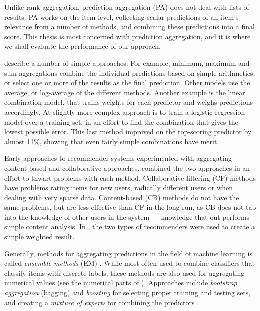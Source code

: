Unlike rank aggregation, prediction aggregation (PA) does not deal with lists of results.
PA works on the item-level, collecting scalar predictions of an item's relevance from a number of methods,
and combining these predictions into a final score.
This thesis is most concerned with prediction aggregation,
and it is where we shall evaluate the performance of our approach.

\cite{Aslam2001} describe a number of simple approaches.
For example, minimum, maximum and sum aggregations combine the individual 
predictions based on simple arithmetics, 
or select one or more of the results as the final prediction. 
Other models use the average, or log-average of the different methods.
Another example is the linear combination model, that trains weights for each predictor and weighs predictions accordingly.
At slightly more complex approach is to train a logistic regression model \cite[p.3]{Aslam2001}
over a training set, in an effort to find the combination that gives the lowest possible error.
This last method improved on the top-scoring predictor by almost 11\%,
showing that even fairly simple combinations have merit.

Early approaches to recommender systems experimented with aggregating content-based and collaborative approaches.
\cite{Claypool1999} combined the two approaches in an effort to thwart problems with each method.
Collaborative filtering (CF) methods have problems rating items for new users, radically different users or when dealing with very sparse data.
Content-based (CB) methods do not have the same problems, but are less effective than CF in the long run, as CB does not tap into the 
knowledge of other users in the system --- knowledge that out-performs simple content analysis.
In \cite{Claypool1999}, the two types of recommenders were used to create a simple weighted result.

Generally, methods for aggregating predictions in the field of machine learning is called \emph{ensemble methods} (EM) \cite{Dietterich2000}.
While most often used to combine classifiers that classify items with discrete labels,
these methods are also used for aggregating numerical values (see the numerical parts of \cite{Breiman1996}).
Approaches include \emph{bootstrap aggregation} (bagging) and \emph{boosting} 
for selecting proper training and testing sets,
and creating a \emph{mixture of experts} for combining the predictors
\cite[p.27]{Polikar2006}.


